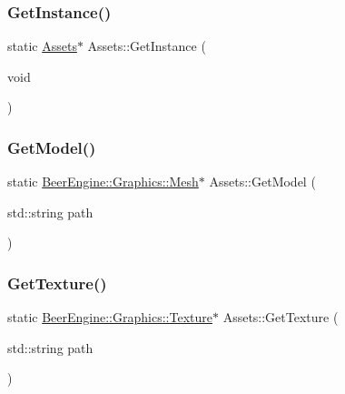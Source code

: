 \mbox{\label{class_assets_a1ec0f88affb09ed018d3f8026f64c15b}} 
\subsubsection{\texorpdfstring{Get\+Instance()}{GetInstance()}}
{\footnotesize\ttfamily static \mbox{\hyperlink{class_assets}{Assets}}$\ast$ Assets\+::\+Get\+Instance (\begin{DoxyParamCaption}\item[{void}]{ }\end{DoxyParamCaption})\hspace{0.3cm}{\ttfamily [static]}}

\mbox{\label{class_assets_a2fcfb2c8c5a0ca4630230f4086b010f6}} 
\subsubsection{\texorpdfstring{Get\+Model()}{GetModel()}}
{\footnotesize\ttfamily static \mbox{\hyperlink{class_beer_engine_1_1_graphics_1_1_mesh}{Beer\+Engine\+::\+Graphics\+::\+Mesh}}$\ast$ Assets\+::\+Get\+Model (\begin{DoxyParamCaption}\item[{std\+::string}]{path }\end{DoxyParamCaption})\hspace{0.3cm}{\ttfamily [static]}}

\mbox{\label{class_assets_a1dc713408638d18566ec35221a0ede24}} 
\subsubsection{\texorpdfstring{Get\+Texture()}{GetTexture()}}
{\footnotesize\ttfamily static \mbox{\hyperlink{class_beer_engine_1_1_graphics_1_1_texture}{Beer\+Engine\+::\+Graphics\+::\+Texture}}$\ast$ Assets\+::\+Get\+Texture (\begin{DoxyParamCaption}\item[{std\+::string}]{path }\end{DoxyParamCaption})\hspace{0.3cm}{\ttfamily [static]}}

